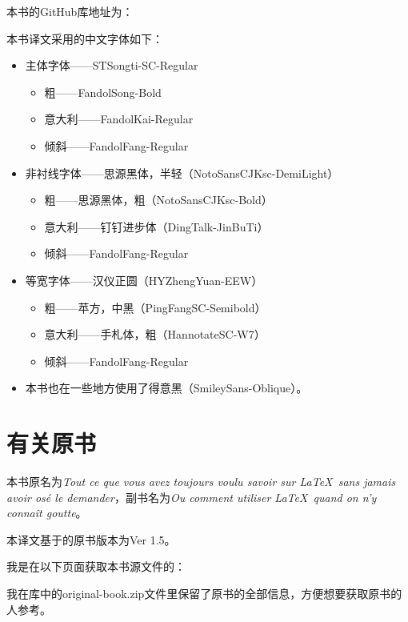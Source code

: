 本书的GitHub库地址为：

\begin{center}
\end{center}

本书译文采用的中文字体如下：

\begin{itemize}
    \item 主体字体——STSongti-SC-Regular
    \begin{itemize}
        \item 粗——FandolSong-Bold
        \item 意大利——FandolKai-Regular
        \item 倾斜——FandolFang-Regular
    \end{itemize}
    \item 非衬线字体——思源黑体，半轻（NotoSansCJKsc-DemiLight）
    \begin{itemize}
        \item 粗——思源黑体，粗（NotoSansCJKsc-Bold）
        \item 意大利——钉钉进步体（DingTalk-JinBuTi）
        \item 倾斜——FandolFang-Regular
    \end{itemize}
    \item 等宽字体——汉仪正圆（HYZhengYuan-EEW）
    \begin{itemize}
        \item 粗——苹方，中黑（PingFangSC-Semibold）
        \item 意大利——手札体，粗（HannotateSC-W7）
        \item 倾斜——FandolFang-Regular
    \end{itemize}
    \item 本书也在一些地方使用了得意黑（SmileySans-Oblique）。
\end{itemize}



\section*{有关原书}

本书原名为\emph{Tout ce que vous avez toujours voulu savoir sur \LaTeX \ sans jamais avoir osé le demander}，副书名为\emph{Ou comment utiliser \LaTeX \ quand on n'y connaît goutte}。

本译文基于的原书版本为Ver 1.5。

我是在以下页面获取本书源文件的：

\begin{center}
\end{center}

我在库中的original-book.zip文件里保留了原书的全部信息，方便想要获取原书的人参考。
